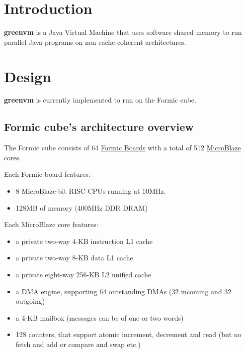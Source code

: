 \documentclass[
a4paper,
12pt,
]{report}
\newcommand{\gvm}{{\fontfamily{fco}\selectfont\textbf{\color{g}green\color{v}vm}}\xspace}
\newcommand{\mblaze}{MicroBlaze\texttrademark\xspace}
\newcommand{\java}{Java\texttrademark\xspace}
\begin{document}

\pagestyle{plain}
\listoftodos
\newpage
\tableofcontents
\newpage
\thispagestyle{empty}
\pagestyle{headings}

\chapter*{Introduction}

\gvm is a \java Virtual Machine that uses software shared memory to run
parallel \java programs on non cache-coherent architectures.

\chapter{Design}

\gvm is currently implemented to run on the Formic cube.

\section{Formic cube's architecture overview}

The Formic cube consists of 64
\href{http://www.formic-board.com/}{Formic Boards} with a total of 512
\href{http://www.xilinx.com/tools/microblaze.htm}{\mblaze} cores.

Each Formic board features:
\begin{itemize}
\item 8 \mblaze 32-bit RISC CPUs running at 10MHz.
\item 128MB of memory (400MHz DDR DRAM)
\end{itemize}

Each \mblaze core features:
\begin{itemize}
\item a private two-way 4-KB instruction L1 cache
\item a private two-way 8-KB data L1 cache
\item a private eight-way 256-KB L2 unified cache
\item a DMA engine, supporting 64 outstanding DMAs (32 incoming and 32 outgoing)
\item a 4-KB mailbox (messages can be of one or two words)
\item 128 counters, that support atomic increment, decrement and read
  (but no fetch and add or compare and swap etc.)
\end{itemize}
\end{document}
